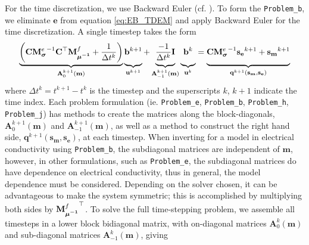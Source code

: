 For the time discretization, we use Backward Euler (cf. \cite{Ascher2008}). To
form the \TDEM \texttt{Problem\_b}, we eliminate $\mathbf{e}$ from equation
\ref{eq:EB_TDEM} and apply Backward Euler for the time discretization. A
single timestep takes the form
\begin{equation}
    \underbrace{\left( \mathbf{C} \MeSigma^{-1} \mathbf{C}^\top \MfMui + \frac{1}{\Delta t^{k}} \right)}_{\mathbf{A}^{k+1}_0(\mathbf{m})}
    \underbrace{\vphantom{\left(\frac{-1}{\Delta t^{k}}\right)}
    \mathbf{b}^{k+1}}_{\mathbf{u}^{k+1}}
    + \underbrace{\vphantom{\left(\frac{-1}{\Delta t^{k}}\right)} \frac{-1}{\Delta t^{k}} \mathbf{I}}_{\mathbf{A}_{-1}^{k+1}(\mathbf{m})}
    \underbrace{\vphantom{\left(\frac{-1}{\Delta t^{k}}\right)}
    \mathbf{b}^{k}}_{\mathbf{u}^{k}}
    = \underbrace{\vphantom{\left(\frac{-1}{\Delta t^{k}}\right)}
    \mathbf{C}\MeSigma^{-1} \mathbf{s_e}^{k+1}
    + \mathbf{s_m}^{k+1}}_{\mathbf{q}^{k+1}(\mathbf{s_m, s_e})}
    \label{eq:TDEM_b_single}
\end{equation}
where $\Delta t^k = t^{k+1} - t^{k}$ is the timestep and the superscripts $k$,
$k+1$ indicate the time index. Each \TDEM problem formulation (ie.
\texttt{Problem\_e}, \texttt{Problem\_b}, \texttt{Problem\_h},
\texttt{Problem\_j}) has methods to create the matrices along the block-diagonals,
$\mathbf{A}_0^{k+1}(\mathbf{m})$ and $\mathbf{A}_{-1}^{k+1}(\mathbf{m})$,
as well as a method to construct the right hand side, $\mathbf{q}^{k+1}(\mathbf{s_m, s_e})$,
at each timestep. When inverting for a model in electrical
conductivity using \texttt{Problem\_b}, the subdiagonal matrices are
independent of $\mathbf{m}$, however, in other formulations, such as \texttt{Problem\_e},
the subdiagonal matrices do have dependence on electrical conductivity, thus in general, the model
dependence must be considered. Depending on the solver chosen, it can be
advantageous to make the system symmetric; this is accomplished by multiplying
both sides by ${{\mathbf M}^f_{\boldsymbol{\mu^{-1}}}}^\top$. To solve the full time-stepping problem, we
assemble all timesteps in a lower block bidiagonal matrix, with on-diagonal
matrices $\mathbf{A}_0^k(\mathbf{m})$ and sub-diagonal matrices
$\mathbf{A}_{-1}^k(\mathbf{m})$, giving
